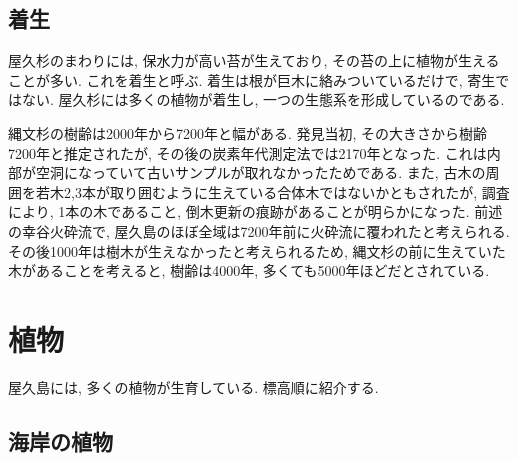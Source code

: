 \documentclass[10pt,titlepage,a5paper]{ltjsbook}
\begin{document}
  \subsection{着生}
    屋久杉のまわりには, 保水力が高い苔が生えており, その苔の上に植物が生えることが多い. これを着生と呼ぶ. 着生は根が巨木に絡みついているだけで, 寄生ではない. 屋久杉には多くの植物が着生し, 一つの生態系を形成しているのである.
  \vspace{1em}
  \begin{tcolorbox}[title=コラム:縄文杉は何歳?,width=\textwidth]
    縄文杉の樹齢は2000年から7200年と幅がある. 発見当初, その大きさから樹齢7200年と推定されたが, その後の炭素年代測定法では2170年となった. これは内部が空洞になっていて古いサンプルが取れなかったためである.
    また, 古木の周囲を若木2,3本が取り囲むように生えている合体木ではないかともされたが, 調査により, 1本の木であること, 倒木更新の痕跡があることが明らかになった. 前述の幸谷火砕流で, 屋久島のほぼ全域は7200年前に火砕流に覆われたと考えられる. その後1000年は樹木が生えなかったと考えられるため, 縄文杉の前に生えていた木があることを考えると, 樹齢は4000年, 多くても5000年ほどだとされている.
  \end{tcolorbox}
\section{植物}
  屋久島には, 多くの植物が生育している. 標高順に紹介する.
  \subsection{海岸の植物}
    
\end{document}

